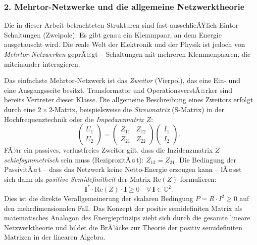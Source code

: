 ﻿\documentclass[12pt, a4paper]{article}
\begin{document}
	\subsubsection*{2. \quad Mehrtor-Netzwerke und die allgemeine Netzwerktheorie}

	Die in dieser Arbeit betrachteten Strukturen sind fast ausschlieÃŸlich Eintor-Schaltungen (Zweipole): Es gibt genau ein Klemmpaar, an dem Energie ausgetauscht wird. Die reale Welt der Elektronik und der Physik ist jedoch von \textit{Mehrtor-Netzwerken} geprÃ¤gt -- Schaltungen mit mehreren Klemmenpaaren, die miteinander interagieren.

	Das einfachste Mehrtor-Netzwerk ist das \textit{Zweitor} (Vierpol), das eine Ein- und eine Ausgangsseite besitzt. Transformator und OperationsverstÃ¤rker sind bereits Vertreter dieser Klasse. Die allgemeine Beschreibung eines Zweitors erfolgt durch eine $2 \times 2$-Matrix, beispielsweise die \textit{Streumatrix} (S-Matrix) in der Hochfrequenztechnik oder die \textit{Impedanzmatrix} $Z$:
	\begin{equation}
		\begin{pmatrix} U_1 \\ U_2 \end{pmatrix} = \begin{pmatrix} Z_{11} & Z_{12} \\ Z_{21} & Z_{22} \end{pmatrix} \begin{pmatrix} I_1 \\ I_2 \end{pmatrix}.
	\end{equation}
	FÃ¼r ein passives, verlustfreies Zweitor gilt, dass die Inzidenzmatrix $Z$ \textit{schiefsymmetrisch} sein muss (ReziprozitÃ¤t): $Z_{12} = Z_{21}$. Die Bedingung der PassivitÃ¤t -- dass das Netzwerk keine Netto-Energie erzeugen kann -- lÃ¤sst sich dann als \textit{positive Semidefinitheit} der Matrix $\mathrm{Re}(Z)$ formulieren:
	\begin{equation}
		\mathbf{I}^* \cdot \mathrm{Re}(Z) \cdot \mathbf{I} \geq 0 \quad \forall\, \mathbf{I} \in \mathbb{C}^2.
	\end{equation}
	Dies ist die direkte Verallgemeinerung der skalaren Bedingung $P = R \cdot I^2 \geq 0$ auf den mehrdimensionalen Fall. Das Konzept der positiv semidefiniten Matrix als matematisches Analogon des Energieprinzips zieht sich durch die gesamte lineare Netzwerktheorie und bildet die BrÃ¼cke zur Theorie der positiv semidefiniten Matrizen in der linearen Algebra.
\end{document}
